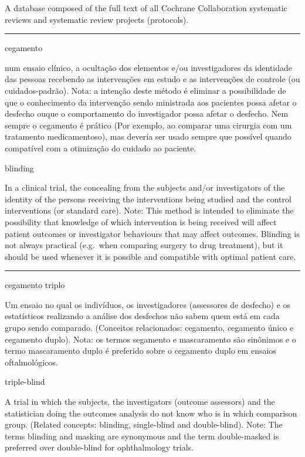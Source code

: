 \documentclass[
]{book}
\begin{document}
A database composed of the full text of all Cochrane Collaboration systematic reviews and systematic review projects (protocols).

\begin{center}\rule{0.5\linewidth}{0.5pt}\end{center}

cegamento

num ensaio clínico, a ocultação dos elementos e/ou investigadores da identidade das pessoas recebendo as intervenções em estudo e as intervenções de controle (ou cuidados-padrão). Nota: a intenção deste método é eliminar a possibilidade de que o conhecimento da intervenção sendo ministrada aos pacientes possa afetar o desfecho ouque o comportamento do investigador possa afetar o desfecho. Nem sempre o cegamento é prático (Por exemplo, ao comparar uma cirurgia com um tratamento medicamentoso), mas deveria ser usado sempre que possível quando compatível com a otimização do cuidado ao paciente.

blinding

In a clinical trial, the concealing from the subjects and/or investigators of the identity of the persons receiving the interventions being studied and the control interventions (or standard care). Note: This method is intended to eliminate the possibility that knowledge of which intervention is being received will affect patient outcomes or investigator behaviours that may affect outcomes. Blinding is not always practical (e.g.~when comparing surgery to drug treatment), but it should be used whenever it is possible and compatible with optimal patient care.

\begin{center}\rule{0.5\linewidth}{0.5pt}\end{center}

cegamento triplo

Um ensaio no qual os indivíduos, os investigadores (assessores de desfecho) e os estatísticos realizando a análise dos desfechos não sabem quem está em cada grupo sendo comparado. (Conceitos relacionados: cegamento, cegamento único e cegamento duplo). Nota: os termos segamento e mascaramento são sinônimos e o termo mascaramento duplo é preferido sobre o cegamento duplo em ensaios oftalmológicos.

triple-blind

A trial in which the subjects, the investigators (outcome assessors) and the statistician doing the outcomes analysis do not know who is in which comparison group. (Related concepts: blinding, single-blind and double-blind). Note: The terms blinding and masking are synonymous and the term double-masked is preferred over double-blind for ophthalmology trials.
\end{document}
